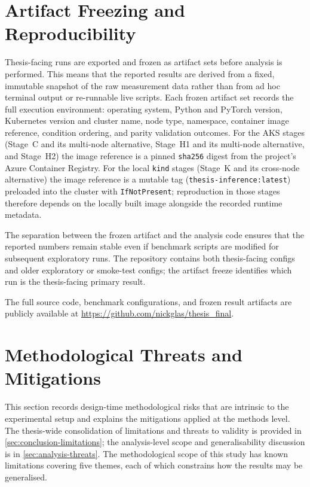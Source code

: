 \section{Artifact Freezing and Reproducibility}
\label{sec:methods-artifacts}

Thesis-facing runs are exported and frozen as artifact sets before analysis is
performed.
This means that the reported results are derived from a fixed, immutable snapshot of the
raw measurement data rather than from ad hoc terminal output or re-runnable live
scripts.
Each frozen artifact set records the full execution environment: operating system,
Python and PyTorch version, Kubernetes version and cluster name, node type, namespace,
container image reference, condition ordering, and parity validation outcomes. For the
AKS stages (Stage~C and its multi-node alternative, Stage~H1 and its multi-node
alternative, and Stage~H2) the image reference is a pinned
\texttt{sha256} digest from the project's Azure Container Registry. For the local
\texttt{kind} stages (Stage~K and its cross-node alternative) the image reference is a mutable tag
(\texttt{thesis-inference:latest}) preloaded into the cluster with
\texttt{IfNotPresent}; reproduction in those stages therefore depends on the locally
built image alongside the recorded runtime metadata.

The separation between the frozen artifact and the analysis code ensures that the
reported numbers remain stable even if benchmark scripts are modified for subsequent
exploratory runs.
The repository contains both thesis-facing configs and older exploratory or smoke-test
configs; the artifact freeze identifies which run is the thesis-facing primary result.

The full source code, benchmark configurations, and frozen result artifacts are
publicly available at
\url{https://github.com/nickglas/thesis_final}.

\section{Methodological Threats and Mitigations}
\label{sec:methods-limitations}

This section records design-time methodological risks that are intrinsic to
the experimental setup and explains the mitigations applied at the methods
level. The thesis-wide consolidation of limitations and threats to validity is
provided in \cref{sec:conclusion-limitations}; the analysis-level scope and
generalisability discussion is in \cref{sec:analysis-threats}. The methodological
scope of this study has known limitations covering five themes, each of which
constrains how the results may be generalised.

